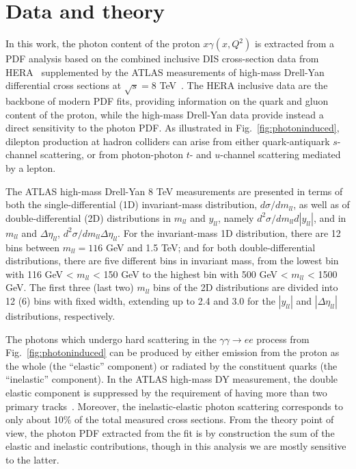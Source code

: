\section{Data and theory}
\label{sec:theory}

In this work, the photon content of the proton $x\gamma(x,Q^2)$ is
extracted from a PDF analysis based on the combined inclusive DIS
cross-section data from HERA~\cite{Abramowicz:2015mha}
supplemented by the ATLAS measurements of high-mass Drell-Yan
differential cross sections at $\sqrt{s}=8$ TeV~\cite{Aad:2016zzw}.
%
The HERA inclusive data are the backbone of modern PDF fits, providing
information on the quark and gluon content of the proton, while
the high-mass Drell-Yan data provide instead a direct sensitivity to the
photon PDF.
%
As illustrated in Fig.~\ref{fig:photoninduced}, 
 dilepton production at hadron colliders can arise
from either quark-antiquark $s$-channel scattering, or from
photon-photon $t$- and $u$-channel scattering mediated by a lepton.

The ATLAS high-mass Drell-Yan 8 TeV measurements are presented in terms
of both the
single-differential (1D) invariant-mass distribution,
$d\sigma/dm_{ll}$, as well as of double-differential (2D)
distributions in $m_{ll}$ and $y_{ll}$, namely
$d^{2}\sigma/dm_{ll}d|y_{ll}|$, and in $m_{ll}$ and $\Delta\eta_{ll}$,
$d^{2}\sigma/dm_{ll}\Delta\eta_{ll}$.
%
For the invariant-mass 1D distribution, there are 12 bins between $m_{ll}=116$ GeV
and 1.5 TeV; and for both double-differential distributions,
there are five different bins in invariant mass,
from the lowest bin with 116 GeV < $m_{ll}$ <
150 GeV to the highest bin with 500 GeV < $m_{ll}$ < 1500 GeV.
The first three (last two) $m_{ll}$ bins of the 2D distributions are divided into 12 (6) bins
with fixed width, extending up to 2.4 and 3.0 for the $|y_{ll}|$
and $|\Delta\eta_{ll}|$ distributions, respectively.
%

The photons which undergo hard scattering in the
$\gamma\gamma \to ee$  process from Fig.~\ref{fig:photoninduced}
can be produced by either  emission from the
proton as the whole (the ``elastic'' component) or radiated by the constituent quarks
(the ``inelastic'' component).
%
In the ATLAS high-mass DY measurement, the double elastic component is suppressed
 by the
 requirement of having more than two primary tracks~\cite{Aad:2016zzw}.
 Moreover, the inelastic-elastic photon scattering corresponds to only about
 10\% of the total measured cross sections.
 From the theory point of view, the photon PDF extracted from the
 fit is by construction the sum of the elastic and inelastic contributions,
 though in this analysis we are mostly sensitive to the latter.

